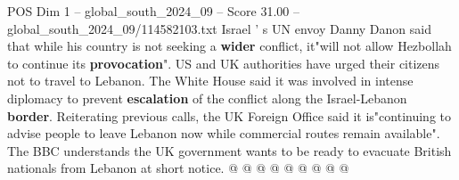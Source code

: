 \begin{textsample}{POS Dim 1 – global\_south\_2024\_09 – Score 31.00 – global\_south\_2024\_09/114582103.txt}
Israel ' s UN envoy Danny Danon said that while his country is not seeking a \textbf{wider} conflict, it"will not allow Hezbollah to continue its \textbf{provocation}".
US and UK authorities have urged their citizens not to travel to Lebanon.
The White House said it was involved in intense diplomacy to prevent \textbf{escalation} of the conflict along the Israel-Lebanon \textbf{border}.
Reiterating previous calls, the UK Foreign Office said it is"continuing to advise people to leave Lebanon now while commercial routes remain available".
The BBC understands the UK government wants to be ready to evacuate British nationals from Lebanon at short notice. @ @ @ @ @ @ @ @ @

\end{textsample}
